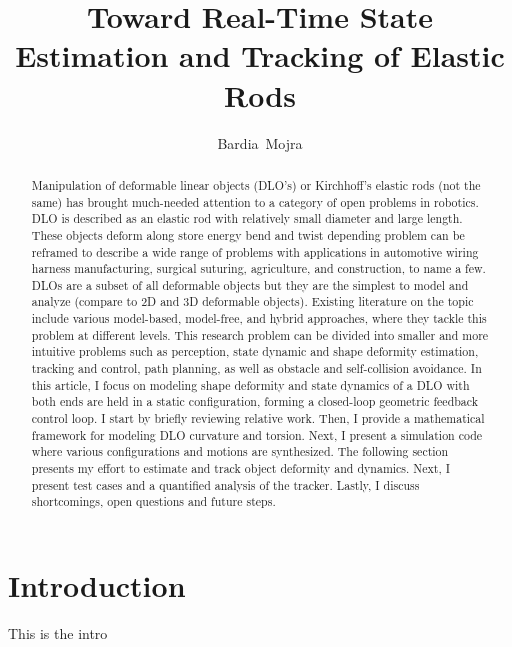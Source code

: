 \documentclass[journal]{IEEEtran}
\begin{document}
%
\title{Toward Real-Time State Estimation and Tracking of Elastic Rods}
\author{Bardia~Mojra}
\maketitle

\begin{abstract}
Manipulation of deformable linear objects (DLO's) or Kirchhoff's elastic rods
(not the same)
has
brought much-needed attention to a category of open problems in robotics.
DLO is described as an elastic rod with relatively small diameter and large
length. These objects deform along store energy  bend and twist depending  problem can be reframed to describe a wide range of
problems with applications in automotive wiring harness manufacturing, surgical
suturing, agriculture, and construction, to name a few. DLOs are a subset of
all deformable objects but they are the simplest to model and analyze (compare to
2D and 3D deformable objects).
Existing literature on the topic include various model-based, model-free, and
hybrid approaches, where they tackle this problem at different levels.
This research problem can be divided into smaller and more intuitive problems such
as perception, state dynamic and shape deformity estimation, tracking and control,
path planning, as well as obstacle and self-collision avoidance.
In this article, I focus on modeling shape deformity and state dynamics of
a DLO with both ends are held in a static configuration, forming a closed-loop
geometric feedback control loop. I start by briefly reviewing relative work.
Then, I provide a mathematical framework for modeling DLO curvature and torsion.
Next, I present a simulation code where various configurations and motions are
synthesized. The following section presents my effort to estimate and track
object deformity and dynamics. Next, I present test cases and a quantified
analysis of the tracker. Lastly, I discuss shortcomings, open questions and
future steps.
\end{abstract}



\section{Introduction}
This is the intro\\
\end{document}
